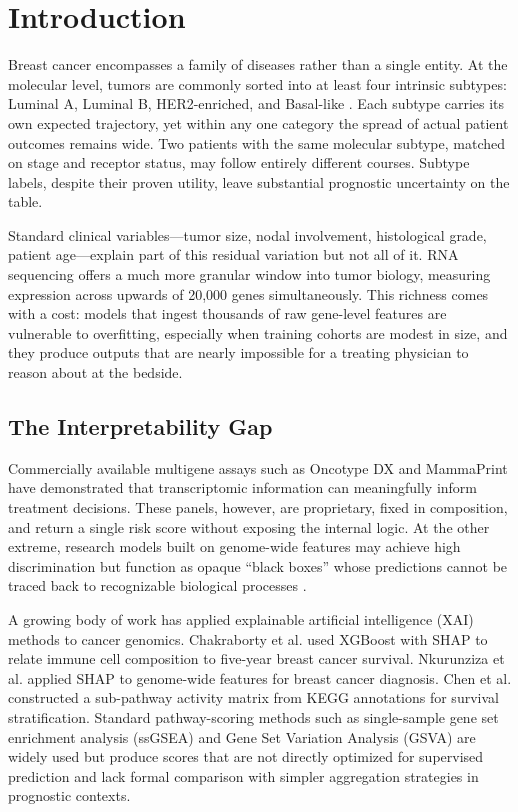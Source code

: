 \documentclass[11pt]{article}
\begin{document}
\section{Introduction}
\label{sec:intro}

Breast cancer encompasses a family of diseases rather than a single entity. At the molecular level, tumors are commonly sorted into at least four intrinsic subtypes: Luminal A, Luminal B, HER2-enriched, and Basal-like \citep{tcga2012}. Each subtype carries its own expected trajectory, yet within any one category the spread of actual patient outcomes remains wide. Two patients with the same molecular subtype, matched on stage and receptor status, may follow entirely different courses. Subtype labels, despite their proven utility, leave substantial prognostic uncertainty on the table.

Standard clinical variables---tumor size, nodal involvement, histological grade, patient age---explain part of this residual variation but not all of it. RNA sequencing offers a much more granular window into tumor biology, measuring expression across upwards of 20,000 genes simultaneously. This richness comes with a cost: models that ingest thousands of raw gene-level features are vulnerable to overfitting, especially when training cohorts are modest in size, and they produce outputs that are nearly impossible for a treating physician to reason about at the bedside.

\subsection{The Interpretability Gap}

Commercially available multigene assays such as Oncotype DX \citep{paik2004} and MammaPrint \citep{vantveer2002,cardoso2016} have demonstrated that transcriptomic information can meaningfully inform treatment decisions. These panels, however, are proprietary, fixed in composition, and return a single risk score without exposing the internal logic. At the other extreme, research models built on genome-wide features may achieve high discrimination but function as opaque ``black boxes'' whose predictions cannot be traced back to recognizable biological processes \citep{rudin2019}.

A growing body of work has applied explainable artificial intelligence (XAI) methods to cancer genomics. Chakraborty et al. \citep{chakraborty2021} used XGBoost with SHAP to relate immune cell composition to five-year breast cancer survival. Nkurunziza et al. \citep{nature2025shap} applied SHAP to genome-wide features for breast cancer diagnosis. Chen et al. \citep{chen2021pathway} constructed a sub-pathway activity matrix from KEGG annotations for survival stratification. Standard pathway-scoring methods such as single-sample gene set enrichment analysis (ssGSEA) \citep{barbie2009} and Gene Set Variation Analysis (GSVA) \citep{hanzelmann2013} are widely used but produce scores that are not directly optimized for supervised prediction and lack formal comparison with simpler aggregation strategies in prognostic contexts.
\end{document}
